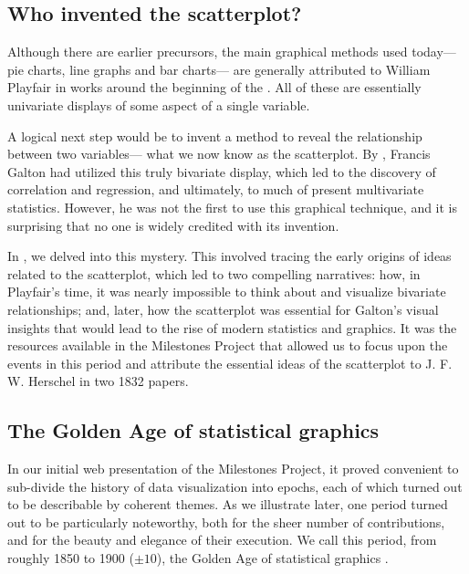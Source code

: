 \subsection{Who invented the scatterplot?}
Although there are earlier precursors, the main graphical methods used today---
pie charts, line graphs and bar charts--- are generally attributed to
William Playfair in works around the beginning of the 
\citep{Playfair:1786,Playfair:1801}.
All of these are essentially univariate
displays of some aspect of a single variable. 

A logical next step would be to invent a method to reveal the relationship 
between two variables--- what we now know as the scatterplot.
By \citeyear{Galton:1886}, Francis Galton had utilized this truly bivariate 
display, which led to the
discovery of correlation and regression, and ultimately, to much of present 
multivariate
statistics. 
However, he was not the first to use this graphical technique, and it is 
surprising that no one is widely credited with its invention.

In \citet{FriendlyDenis:05:scat}, we delved into this mystery.
This involved tracing the early origins of ideas related to the scatterplot, 
which led to two compelling narratives: how, in Playfair's time, it was nearly 
impossible to think about and visualize bivariate relationships; and, later, 
how the scatterplot was essential for Galton's visual insights that would lead 
to the rise of modern statistics and graphics.
It was the resources available in the Milestones Project that allowed us to 
focus upon the events in this period and attribute the essential ideas of the 
scatterplot to J. F. W. Herschel in two 1832 papers.

\subsection{The Golden Age of statistical graphics}

In our initial web presentation of the Milestones Project, it proved convenient
to sub-divide the history of data visualization into epochs, each of which 
turned
out to be describable by coherent themes.
As we illustrate later, one
period turned out to be particularly noteworthy, both for the sheer number of
contributions, and for the beauty and elegance of their execution.
We call this period, from roughly 1850 to 1900 ($\pm 10$), the Golden Age of 
statistical graphics \citep{Friendly:2008:golden}.


